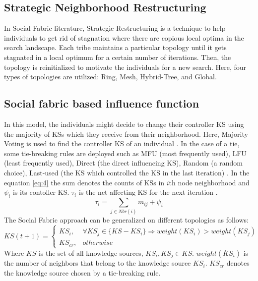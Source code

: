 \subsection{Strategic Neighborhood Restructuring}In Social Fabric literature, Strategic Restructuring is a technique to help individuals to get rid of stagnation where there are copious local optima in the search landscape. Each tribe maintains a particular topology until it gets stagnated in a local optimum for a certain number of iterations. Then, the topology is reinitialized to motivate the individuals for a new search. Here, four types of topologies are utilized: Ring, Mesh, Hybrid-Tree, and Global.
\subsection{Social fabric based influence function} In this model, the individuals might decide to change their controller KS using the majority of KSs which they receive from their neighborhood. Here, Majority Voting is used to find the controller KS of an individual \cite{che2010robust}. In the case of a tie, some tie-breaking rules are deployed such as MFU (most frequently used), LFU (least frequently used), Direct (the direct influencing KS), Random (a random choice), Last-used (the KS which controlled the KS in the last iteration) \cite{ali2012socio}. In the equation \ref{eq:4} the sum denotes the counts of KSs in $i$th node neighborhood and $\psi_{i}$ is its contoller KS. $\tau_{i}$ is the net affecting KS for the next iteration \cite{ali2016leveraged} \cite{sterling2004aggregation}. 
\begin{equation}
\label{eq:4}
\tau_{i}=\sum_{j \in Nbr(i)}m_{ij} + \psi_{i}
\end{equation}
The Social Fabric approach can be generalized on different topologies as follows:
\begin{equation}
	KS(t+1)=
		\begin{cases}
			KS_{i}, & \forall KS_{j}\in \{KS-KS_{i}\}\Rightarrow weight(KS_{i}) > weight(KS_{j}) \\
			KS_{cr}, & otherwise
		\end{cases}
\end{equation}
Where $KS$ is the set of all knowledge sources, $KS_{i}, KS_{j}\in KS$. $weight(ܵKS_{i})$ is the number of neighbors that belong to the knowledge source $KS_{i}$. $KS_{cr}$ denotes the knowledge source chosen by a tie-breaking rule.
